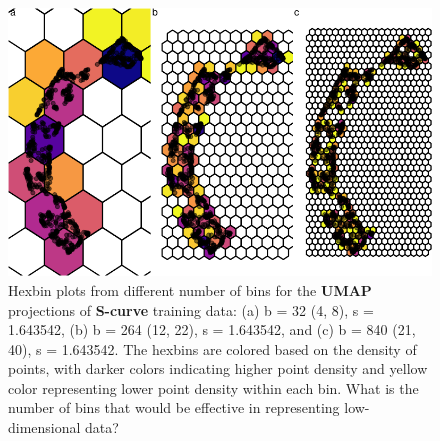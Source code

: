 \documentclass[
  12pt]{article}
\begin{document}
\begin{figure}[H]

{\centering \includegraphics{paper_files/figure-pdf/fig-binsize-1.pdf}

}

\caption{\label{fig-binsize}Hexbin plots from different number of bins
for the \textbf{UMAP} projections of \textbf{S-curve} training data: (a)
b = 32 (4, 8), s = 1.643542, (b) b = 264 (12, 22), s = 1.643542, and (c)
b = 840 (21, 40), s = 1.643542. The hexbins are colored based on the
density of points, with darker colors indicating higher point density
and yellow color representing lower point density within each bin. What
is the number of bins that would be effective in representing
low-dimensional data?}

\end{figure}
\end{document}
